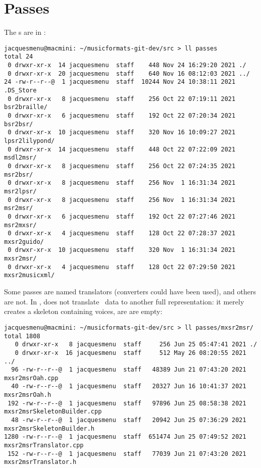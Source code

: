 \section{Passes}

The \pass s are in :
\begin{lstlisting}[language=Terminal]
jacquesmenu@macmini: ~/musicformats-git-dev/src > ll passes
total 24
 0 drwxr-xr-x  14 jacquesmenu  staff    448 Nov 24 16:29:20 2021 ./
 0 drwxr-xr-x  20 jacquesmenu  staff    640 Nov 16 08:12:03 2021 ../
24 -rw-r--r--@  1 jacquesmenu  staff  10244 Nov 24 10:38:11 2021 .DS_Store
 0 drwxr-xr-x   8 jacquesmenu  staff    256 Oct 22 07:19:11 2021 bsr2braille/
 0 drwxr-xr-x   6 jacquesmenu  staff    192 Oct 22 07:20:34 2021 bsr2bsr/
 0 drwxr-xr-x  10 jacquesmenu  staff    320 Nov 16 10:09:27 2021 lpsr2lilypond/
 0 drwxr-xr-x  14 jacquesmenu  staff    448 Oct 22 07:22:09 2021 msdl2msr/
 0 drwxr-xr-x   8 jacquesmenu  staff    256 Oct 22 07:24:35 2021 msr2bsr/
 0 drwxr-xr-x   8 jacquesmenu  staff    256 Nov  1 16:31:34 2021 msr2lpsr/
 0 drwxr-xr-x   8 jacquesmenu  staff    256 Nov  1 16:31:34 2021 msr2msr/
 0 drwxr-xr-x   6 jacquesmenu  staff    192 Oct 22 07:27:46 2021 msr2mxsr/
 0 drwxr-xr-x   4 jacquesmenu  staff    128 Oct 22 07:28:37 2021 mxsr2guido/
 0 drwxr-xr-x  10 jacquesmenu  staff    320 Nov  1 16:31:34 2021 mxsr2msr/
 0 drwxr-xr-x   4 jacquesmenu  staff    128 Oct 22 07:29:50 2021 mxsr2musicxml/
\end{lstlisting}

Some passes are named translators (converters could have been used), and others are not. In \mxsrToMsr{},  does not translate \mxml\ data to another full representation: it merely creates a skeleton containing voices, are are empty:
\begin{lstlisting}[language=Terminal]
jacquesmenu@macmini: ~/musicformats-git-dev/src > ll passes/mxsr2msr/
total 1808
   0 drwxr-xr-x   8 jacquesmenu  staff     256 Jun 25 05:47:41 2021 ./
   0 drwxr-xr-x  16 jacquesmenu  staff     512 May 26 08:20:55 2021 ../
  96 -rw-r--r--@  1 jacquesmenu  staff   48389 Jun 21 07:43:20 2021 mxsr2msrOah.cpp
  40 -rw-r--r--@  1 jacquesmenu  staff   20327 Jun 16 10:41:37 2021 mxsr2msrOah.h
 192 -rw-r--r--@  1 jacquesmenu  staff   97896 Jun 25 08:58:38 2021 mxsr2msrSkeletonBuilder.cpp
  48 -rw-r--r--@  1 jacquesmenu  staff   20942 Jun 25 07:36:29 2021 mxsr2msrSkeletonBuilder.h
1280 -rw-r--r--@  1 jacquesmenu  staff  651474 Jun 25 07:49:52 2021 mxsr2msrTranslator.cpp
 152 -rw-r--r--@  1 jacquesmenu  staff   77039 Jun 21 07:43:20 2021 mxsr2msrTranslator.h
\end{lstlisting}

